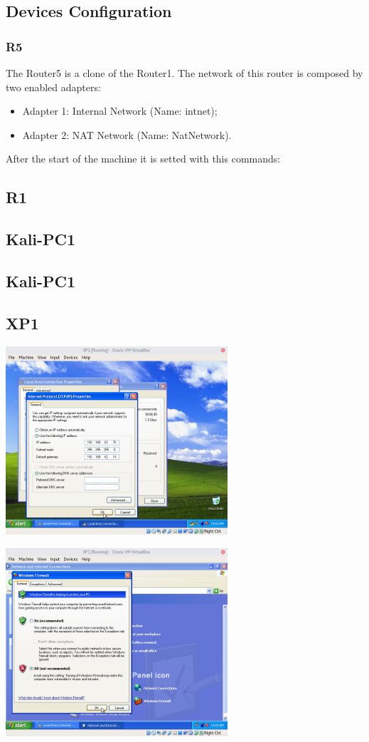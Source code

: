 \subsection{Devices Configuration}

\subsubsection*{R5}
The Router5 is a clone of the Router1.
The network of this router is composed by two enabled adapters:
\begin{itemize}
	\item Adapter 1: Internal Network (Name: intnet);
	\item Adapter 2: NAT Network (Name: NatNetwork).
\end{itemize}
After the start of the machine it is setted with this commands:



\subsection*{R1}


\subsection*{Kali-PC1}


\subsection*{Kali-PC1}


\subsection*{XP1}
\includegraphics[height=7cm]{img/WinXPNetworkConfiguration}\par
\includegraphics[height=7cm]{img/WinXPFirewallDisabled}\par